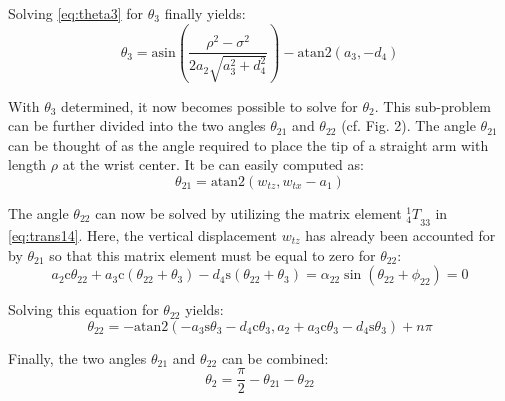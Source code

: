 \documentclass[twoside]{article}
\renewcommand{\c}{\text{c}}
\newcommand{\s}{\text{s}}
\newcommand{\T}[2]{\mbox{$_{#2}^{#1}{T}$}}
\begin{document}
Solving \eqref{eq:theta3} for $\theta_3$ finally yields:
\begin{equation}
  \theta_3 = \text{asin}\left(\frac{\rho^2 - \sigma^2}{2 a_2 \sqrt{a_3^2 + d_4^2}}\right) - \text{atan2}(a_3, -d_4)
\end{equation}

With $\theta_3$ determined, it now becomes possible to solve for $\theta_2$.
This sub-problem can be further divided into the two angles $\theta_{21}$ and $\theta_{22}$ (cf. Fig. 2).
The angle $\theta_{21}$ can be thought of as the angle required to place the tip of a straight arm
with length $\rho$ at the wrist center. It be can easily computed as:
\begin{equation}
  \theta_{21} = \text{atan2}(w_{tz}, w_{tx} - a_1)
\end{equation}

The angle $\theta_{22}$ can now be solved by utilizing the matrix element $\T{1}{4}_{33}$ in
\eqref{eq:trans14}. Here, the vertical displacement $w_{tz}$
has already been accounted for by $\theta_{21}$ so that this matrix element must be equal to zero for $\theta_{22}$:
\begin{equation}
  a_2\c\theta_{22} + a_3\c(\theta_{22} + \theta_3) - d_4\s(\theta_{22} + \theta_3)
    = \alpha_{22} \sin(\theta_{22} + \phi_{22}) = 0
\end{equation}

Solving this equation for $\theta_{22}$ yields:
\begin{equation}
  \theta_{22} = -\text{atan2}(-a_3\s\theta_3 - d_4\c\theta_3, a_2 + a_3\c\theta_3 - d_4\s\theta_3) + n\pi
\end{equation}

Finally, the two angles $\theta_{21}$ and $\theta_{22}$ can be combined:
\begin{equation}
  \theta_2 = \frac{\pi}{2} - \theta_{21} - \theta_{22}
\end{equation}
\end{document}
